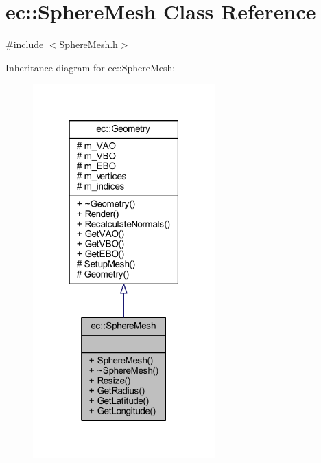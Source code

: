 \hypertarget{classec_1_1_sphere_mesh}{}\section{ec\+:\+:Sphere\+Mesh Class Reference}
\label{classec_1_1_sphere_mesh}


{\ttfamily \#include $<$Sphere\+Mesh.\+h$>$}



Inheritance diagram for ec\+:\+:Sphere\+Mesh\+:\nopagebreak
\begin{figure}[H]
\begin{center}
\leavevmode
\includegraphics[width=199pt]{classec_1_1_sphere_mesh__inherit__graph}
\end{center}
\end{figure}


